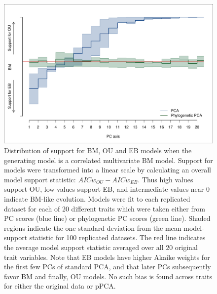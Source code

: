 \documentclass[a4paper,12pt]{article}
\begin{document}
\newpage



\begin{figure}[p]
\centering
\includegraphics[scale=0.65]{./fig/mv-bm-aic.pdf}
\caption{Distribution of support for BM, OU and EB models when the generating model is a correlated multivariate BM model. Support for models were transformed into a linear scale by calculating an overall model support statistic: $AICw_{OU} - AICw_{EB}$. Thus high values support OU, low values support EB, and intermediate values near 0 indicate BM-like evolution. Models were fit to each replicated dataset for each of 20 different traits which were taken either from PC scores (blue line) or phylogenetic PC scores (green line). Shaded regions indicate the one standard deviation from the mean model-support statistic for  100 replicated datasets. The red  line indicates the average model support statistic averaged over all 20 original trait variables. Note that EB models have higher Akaike weights for the first few PCs of standard PCA, and that later PCs subsequently favor BM and finally, OU models. No such bias is found across traits for either the original data or pPCA.}
\label{corbm}
\end{figure}
\end{document}
